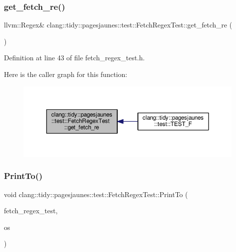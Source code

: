 \subsubsection{\texorpdfstring{get\+\_\+fetch\+\_\+re()}{get\_fetch\_re()}}
{\footnotesize\ttfamily llvm\+::\+Regex\& clang\+::tidy\+::pagesjaunes\+::test\+::\+Fetch\+Regex\+Test\+::get\+\_\+fetch\+\_\+re (\begin{DoxyParamCaption}{ }\end{DoxyParamCaption})\hspace{0.3cm}{\ttfamily [inline]}}



Definition at line 43 of file fetch\+\_\+regex\+\_\+test.\+h.

Here is the caller graph for this function\+:
\nopagebreak
\begin{figure}[H]
\begin{center}
\leavevmode
\includegraphics[width=350pt]{classclang_1_1tidy_1_1pagesjaunes_1_1test_1_1_fetch_regex_test_a5592b292a7f1ea04f6496bef687d9f80_icgraph}
\end{center}
\end{figure}
\mbox{\label{classclang_1_1tidy_1_1pagesjaunes_1_1test_1_1_fetch_regex_test_ae15287c4bf717c39dcc7b29c4d56da7e}} 
\subsubsection{\texorpdfstring{Print\+To()}{PrintTo()}}
{\footnotesize\ttfamily void clang\+::tidy\+::pagesjaunes\+::test\+::\+Fetch\+Regex\+Test\+::\+Print\+To (\begin{DoxyParamCaption}\item[{const \hyperlink{classclang_1_1tidy_1_1pagesjaunes_1_1test_1_1_fetch_regex_test}{Fetch\+Regex\+Test} \&}]{fetch\+\_\+regex\+\_\+test,  }\item[{\+::std\+::ostream $\ast$}]{os }\end{DoxyParamCaption})}



